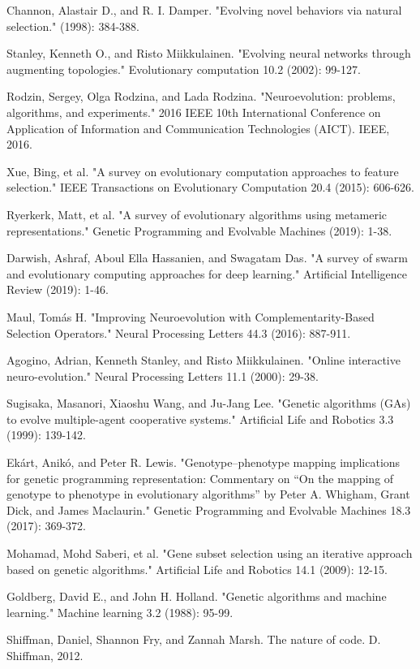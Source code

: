 \documentclass[conference]{IEEEtran}
\begin{document}
\begin{thebibliography}{9}
Channon, Alastair D., and R. I. Damper. "Evolving novel behaviors via natural selection." (1998): 384-388.
 
Stanley, Kenneth O., and Risto Miikkulainen. "Evolving neural networks through augmenting topologies." Evolutionary computation 10.2 (2002): 99-127.
 
Rodzin, Sergey, Olga Rodzina, and Lada Rodzina. "Neuroevolution: problems, algorithms, and experiments." 2016 IEEE 10th International Conference on Application of Information and Communication Technologies (AICT). IEEE, 2016.

Xue, Bing, et al. "A survey on evolutionary computation approaches to feature selection." IEEE Transactions on Evolutionary Computation 20.4 (2015): 606-626.

Ryerkerk, Matt, et al. "A survey of evolutionary algorithms using metameric representations." Genetic Programming and Evolvable Machines (2019): 1-38.

Darwish, Ashraf, Aboul Ella Hassanien, and Swagatam Das. "A survey of swarm and evolutionary computing approaches for deep learning." Artificial Intelligence Review (2019): 1-46.

Maul, Tomás H. "Improving Neuroevolution with Complementarity-Based Selection Operators." Neural Processing Letters 44.3 (2016): 887-911.

Agogino, Adrian, Kenneth Stanley, and Risto Miikkulainen. "Online interactive neuro-evolution." Neural Processing Letters 11.1 (2000): 29-38.

Sugisaka, Masanori, Xiaoshu Wang, and Ju-Jang Lee. "Genetic algorithms (GAs) to evolve multiple-agent cooperative systems." Artificial Life and Robotics 3.3 (1999): 139-142.

Ekárt, Anikó, and Peter R. Lewis. "Genotype–phenotype mapping implications for genetic programming representation: Commentary on “On the mapping of genotype to phenotype in evolutionary algorithms” by Peter A. Whigham, Grant Dick, and James Maclaurin." Genetic Programming and Evolvable Machines 18.3 (2017): 369-372.

Mohamad, Mohd Saberi, et al. "Gene subset selection using an iterative approach based on genetic algorithms." Artificial Life and Robotics 14.1 (2009): 12-15.

Goldberg, David E., and John H. Holland. "Genetic algorithms and machine learning." Machine learning 3.2 (1988): 95-99.

Shiffman, Daniel, Shannon Fry, and Zannah Marsh. The nature of code. D. Shiffman, 2012.


\end{thebibliography}
\end{document}
